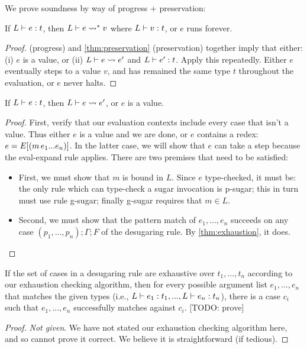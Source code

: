 We prove soundness by way of progress + preservation:
\begin{theorem}[Soundness]
  If $L \vdash e : t$, then
  $L \vdash e \rightsquigarrow^{*} v$ where $L \vdash v : t$, or $e$ runs forever.
\end{theorem}
\begin{proof}
 (progress) and \cref{thm:preservation}
(preservation) together imply that either:
(i) $e$ is a value, or (ii) $L \vdash e \rightsquigarrow e'$ and $L \vdash e' : t$.
Apply this repeatedly. Either $e$ eventually steps to a value $v$, and
has remained the same type $t$ throughout the evaluation, or $e$ never
halts.
\end{proof}

\begin{lemma}[Progress] \label{thm:progress}
  If $L \vdash e : t$, then
  $L \vdash e \rightsquigarrow e'$, or $e$ is a value.
\end{lemma}
\begin{proof}
  First, verify that our evaluation contexts include every case that
  isn't a value. Thus either $e$ is a value and we are done, or $e$
  contains a redex: $e=E[(m\,e_1 ... e_n)]$.
  In the latter case, we will show that $e$ can take a step because
  the eval-expand rule applies. There are two premises that need to be
  satisfied:
  \begin{itemize}
    \item First, we must show that $m$ is bound in $L$. Since $e$
      type-checked, it must be: the only rule which can type-check a
      sugar invocation is p-sugar; this in turn must use rule
      g-sugar; finally g-sugar requires that $m \in L$.
    \item Second, we must show that the pattern match of $e_1,...,e_n$
      succeeds on any case $(p_1,...,p_n);\Gamma;F$ of the desugaring
      rule. By \cref{thm:exhaustion}, it does.
  \end{itemize}
\end{proof}

\begin{assumption}[Exhaustion] \label{thm:exhaustion}
  If the set of cases in a desugaring rule are exhaustive over
  $t_1,...,t_n$ according to our exhaustion checking algorithm, then
  for every possible argument list $e_1,...,e_n$ that matches the
  given types (i.e., $L \vdash e_1 : t_1,...,L \vdash e_n : t_n$),
  there is a case $c_i$ such that $e_1,...,e_n$ successfully matches
  against $c_i$. [TODO: prove]
\end{assumption}
\begin{proof}
  \emph{Not given}. We have not stated our exhaustion checking
  algorithm here, and so cannot prove it correct. We believe it is
  straightforward (if tedious).
\end{proof}

